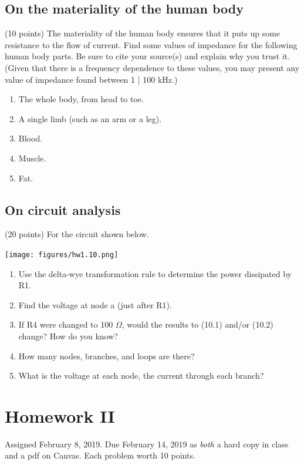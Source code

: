 \documentclass[11pt]{book}
\begin{document}
\section{On the materiality of the human body}
(10 points) The materiality of the human body ensures that it puts up some resistance to the flow of current. Find some values of impedance for the following human body parts. Be sure to cite your source(s) and explain why you trust it. (Given that there is a frequency dependence to these values, you may present any value of impedance found between 1 | 100 kHz.)
\begin{enumerate}
	\item The whole body, from head to toe.
	\item A single limb (such as an arm or a leg).
	\item Blood.
	\item Muscle.
	\item Fat.
\end{enumerate}


\section{On circuit analysis}
(20 points) For the circuit shown below.
\begin{center}
	\texttt{[image: figures/hw1.10.png]}
\end{center}

\begin{enumerate}
	\item Use the delta-wye transformation rule to determine the power dissipated by R1.
	\item Find the voltage at node a (just after R1). 
	\item If R4 were changed to 100 $\Omega$, would the results to (10.1) and/or (10.2) change? How do you know?
	\item How many nodes, branches, and loops are there?
	\item What is the voltage at each node, the current through each branch?
\end{enumerate}




\chapter*{Homework II}
Assigned February 8, 2019. Due February 14, 2019 as \textit{both} a hard copy in class and a pdf on Canvas. Each problem worth 10 points.
\setcounter{chapter}{2}
\setcounter{section}{0}
\end{document}
